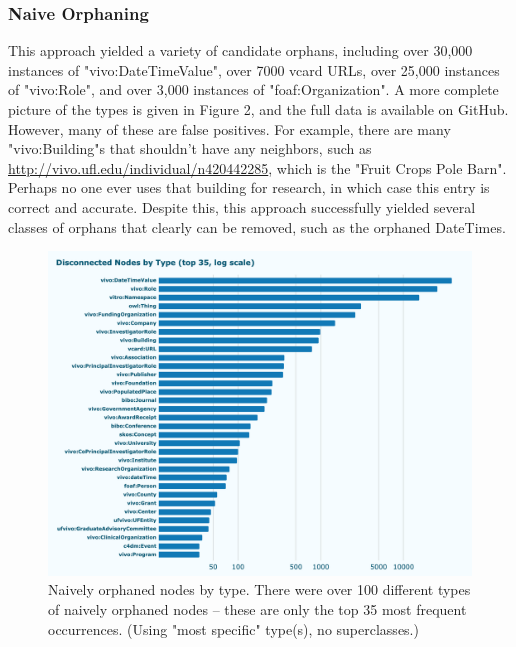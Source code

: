 \documentclass[11pt]{article}
\begin{document}
\subsubsection*{Naive Orphaning}
This approach yielded a variety of candidate orphans, including over 30,000 instances of "vivo:DateTimeValue", over 7000 vcard URLs, over 25,000 instances of "vivo:Role", and over 3,000 instances of "foaf:Organization". A more complete picture of the types is given in Figure 2, and the full data is available on GitHub. However, many of these are false positives. For example, there are many "vivo:Building"s that shouldn't have any neighbors, such as \url{http://vivo.ufl.edu/individual/n420442285}, which is the "Fruit Crops Pole Barn". Perhaps no one ever uses that building for research, in which case this entry is correct and accurate. Despite this, this approach successfully yielded several classes of orphans that clearly can be removed, such as the orphaned DateTimes.

\begin{figure}[h!]
\centering
\includegraphics[width=\textwidth]{orphan-types.png}
\caption{Naively orphaned nodes by type. There were over 100 different types of naively orphaned nodes -- these are only the top 35 most frequent occurrences. (Using "most specific" type(s), no superclasses.)}
\label{fig:output}
\end{figure}
\end{document}
